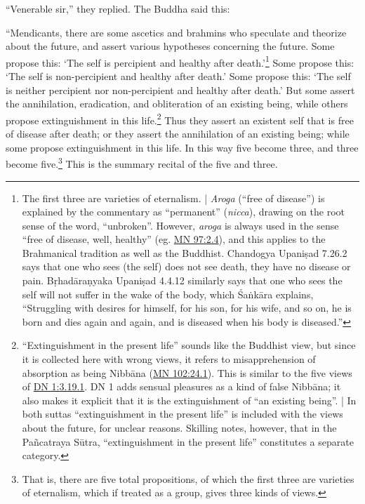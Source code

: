 \documentclass[12pt,openany]{book}%
\begin{document}
“Venerable sir,” they replied. The Buddha said this: 

“Mendicants, there are some ascetics and brahmins who speculate and theorize about the future, and assert various hypotheses concerning the future. Some propose this: ‘The self is percipient and healthy after death.’\footnote{The first three are varieties of eternalism. | \textit{Aroga} (“free of disease”) is explained by the commentary as “permanent” (\textit{nicca}), drawing on the root sense of the word, “unbroken”. However, \textit{aroga} is always used in the sense “free of disease, well, healthy” (eg. \href{https://suttacentral.net/mn97/en/sujato\#2.4}{MN 97:2.4}), and this applies to the Brahmanical tradition as well as the Buddhist. Chandogya \textsanskrit{Upaniṣad} 7.26.2 says that one who sees (the self) does not see death, they have no disease or pain. \textsanskrit{Bṛhadāraṇyaka} \textsanskrit{Upaniṣad} 4.4.12 similarly says that one who sees the self will not suffer in the wake of the body, which \textsanskrit{Śaṅkāra} explains, “Struggling with desires for himself, for his son, for his wife, and so on, he is born and dies again and again, and is diseased when his body is diseased.” } Some propose this: ‘The self is non-percipient and healthy after death.’ Some propose this: ‘The self is neither percipient nor non-percipient and healthy after death.’ But some assert the annihilation, eradication, and obliteration of an existing being, while others propose extinguishment in this life.\footnote{“Extinguishment in the present life” sounds like the Buddhist view, but since it is collected here with wrong views, it refers to misapprehension of absorption as being \textsanskrit{Nibbāna} (\href{https://suttacentral.net/mn102/en/sujato\#24.1}{MN 102:24.1}). This is similar to the five views of \href{https://suttacentral.net/dn1/en/sujato\#3.19.1}{DN 1:3.19.1}. DN 1 adds sensual pleasures as a kind of false \textsanskrit{Nibbāna}; it also makes it explicit that it is the extinguishment of “an existing being”. | In both suttas “extinguishment in the present life” is included with the views about the future, for unclear reasons. Skilling notes, however, that in the \textsanskrit{Pañcatraya} \textsanskrit{Sūtra}, “extinguishment in the present life” constitutes a separate category. } Thus they assert an existent self that is free of disease after death; or they assert the annihilation of an existing being; while some propose extinguishment in this life. In this way five become three, and three become five.\footnote{That is, there are five total propositions, of which the first three are varieties of eternalism, which if treated as a group, gives three kinds of views. } This is the summary recital of the five and three. 
\end{document}
